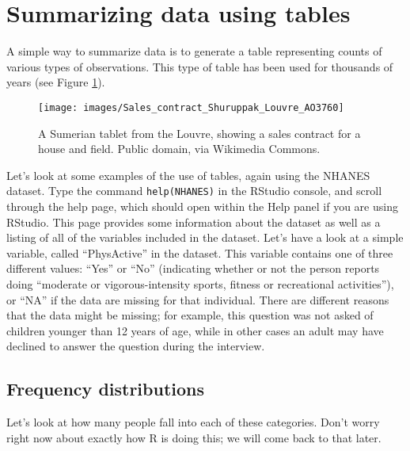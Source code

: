 \documentclass[]{book}
\newenvironment{Shaded}{\begin{snugshade}}{\end{snugshade}}
\newcommand{\KeywordTok}[1]{\textcolor[rgb]{0.13,0.29,0.53}{\textbf{#1}}}
\newcommand{\DataTypeTok}[1]{\textcolor[rgb]{0.13,0.29,0.53}{#1}}
\newcommand{\StringTok}[1]{\textcolor[rgb]{0.31,0.60,0.02}{#1}}
\newcommand{\CommentTok}[1]{\textcolor[rgb]{0.56,0.35,0.01}{\textit{#1}}}
\newcommand{\OperatorTok}[1]{\textcolor[rgb]{0.81,0.36,0.00}{\textbf{#1}}}
\newcommand{\NormalTok}[1]{#1}
\theoremstyle{definition}
\theoremstyle{definition}
\theoremstyle{definition}
\theoremstyle{remark}
\begin{document}
\section{Summarizing data using
tables}\label{summarizing-data-using-tables}

A simple way to summarize data is to generate a table representing
counts of various types of observations. This type of table has been
used for thousands of years (see Figure \ref{fig:salesContract}).

\begin{figure}
\texttt{[image: images/Sales\_contract\_Shuruppak\_Louvre\_AO3760]} \caption{A Sumerian tablet from the Louvre, showing a sales contract for a house and field.  Public domain, via Wikimedia Commons.}\label{fig:salesContract}
\end{figure}

Let's look at some examples of the use of tables, again using the NHANES
dataset. Type the command \texttt{help(NHANES)} in the RStudio console,
and scroll through the help page, which should open within the Help
panel if you are using RStudio. This page provides some information
about the dataset as well as a listing of all of the variables included
in the dataset. Let's have a look at a simple variable, called
``PhysActive'' in the dataset. This variable contains one of three
different values: ``Yes'' or ``No'' (indicating whether or not the
person reports doing ``moderate or vigorous-intensity sports, fitness or
recreational activities''), or ``NA'' if the data are missing for that
individual. There are different reasons that the data might be missing;
for example, this question was not asked of children younger than 12
years of age, while in other cases an adult may have declined to answer
the question during the interview.

\subsection{Frequency distributions}\label{frequency-distributions}

Let's look at how many people fall into each of these categories. Don't
worry right now about exactly how R is doing this; we will come back to
that later.

\begin{Shaded}
\end{Shaded}
\end{document}
